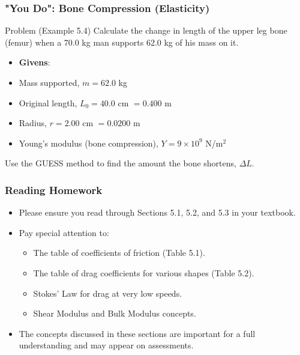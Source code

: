 \documentclass{beamer}
\begin{document}
\begin{frame}
\frametitle{"You Do": Bone Compression (Elasticity)}
\begin{block}{Problem (Example 5.4)}
Calculate the change in length of the upper leg bone (femur) when a 70.0 kg man supports 62.0 kg of his mass on it.
\newline
\begin{itemize}
    \item \textbf{Givens}:
    \item Mass supported, $m = 62.0$ kg
    \item Original length, $L_0 = 40.0$ cm $= 0.400$ m
    \item Radius, $r = 2.00$ cm $= 0.0200$ m
    \item Young's modulus (bone compression), $Y = 9 \times 10^9$ N/m$^2$
\end{itemize}
\vspace{0.3cm}
Use the GUESS method to find the amount the bone shortens, $\Delta L$.
\end{block}
\end{frame}

\begin{frame}
\frametitle{Reading Homework}
\begin{itemize}
    \item Please ensure you read through Sections 5.1, 5.2, and 5.3 in your textbook. \pause
    \item Pay special attention to:
    \begin{itemize}
        \item The table of coefficients of friction (Table 5.1).
        \item The table of drag coefficients for various shapes (Table 5.2).
        \item Stokes' Law for drag at very low speeds.
        \item Shear Modulus and Bulk Modulus concepts.
    \end{itemize} \pause
    \item The concepts discussed in these sections are important for a full understanding and may appear on assessments.
\end{itemize}
\end{frame}
\end{document}
